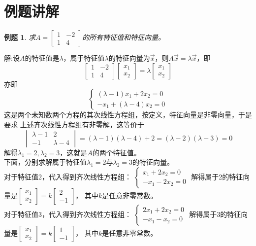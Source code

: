 \documentclass[a4paper]{book}
\newtheorem{eg}{例题}[chapter]
\begin{document}
\section{例题讲解}
\begin{eg}
求$A=\begin{bmatrix}1&-2\\1&4\end{bmatrix}$的所有特征值和特征向量。
\end{eg}
解:设$A$的特征值是$\lambda$，属于特征值$\lambda$的特征向量为$\vec{x}$，则$A\vec{x}=\lambda\vec{x}$，即
\begin{equation*}
\begin{bmatrix}1&-2\\1&4\end{bmatrix}\begin{bmatrix}x_1\\x_2\end{bmatrix}=
\lambda\begin{bmatrix}x_1\\x_2\end{bmatrix}
\end{equation*}
亦即
\begin{equation*}
\begin{cases}
(\lambda-1)x_1+2x_2=0\\
-x_1+(\lambda-4)x_2=0
\end{cases}
\end{equation*}
这是两个未知数两个方程的其次线性方程组，按定义，特征向量是非零向量，于是要求
上述齐次线性方程组有非零解，这等价于
\begin{equation*}
\begin{vmatrix}
\lambda-1&2\\-1&\lambda-4
\end{vmatrix}
=(\lambda-1)(\lambda-4)+2=(\lambda-2)(\lambda-3)=0
\end{equation*}
解得$\lambda_1=2,\lambda_2=3$，这就是$A$的两个特征值。\\
下面，分别求解属于特征值$\lambda_1=2$与$\lambda_2=3$的特征向量。\\
对于特征值2，代入得到齐次线性方程组：
$\begin{cases}x_1+2x_2=0\\-x_1-2x_2=0\end{cases}$
解得属于2的特征向量是$\begin{bmatrix}x_1\\x_2\end{bmatrix}=k\begin{bmatrix}2\\-1\end{bmatrix}$，
其中$k$是任意非零常数。\\
对于特征值3，代入得到齐次线性方程组：
$\begin{cases}2x_1+2x_2=0\\-x_1-x_2=0\end{cases}$
解得属于3的特征向量是$\begin{bmatrix}x_1\\x_2\end{bmatrix}=k\begin{bmatrix}1\\-1\end{bmatrix}$，
其中$k$是任意非零常数。
\end{document}
